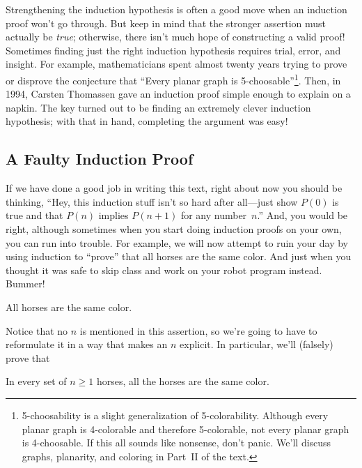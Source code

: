 Strengthening the induction hypothesis is often a good move when an
induction proof won't go through.  But keep in mind that the stronger
assertion must actually be \emph{true}; otherwise, there isn't much hope
of constructing a valid proof!  Sometimes finding just the right induction
hypothesis requires trial, error, and insight.  For example,
mathematicians spent almost twenty years trying to prove or disprove the
conjecture that ``Every planar graph is
5-choosable''\footnote{5-choosability is a slight generalization of
  5-colorability.  Although every planar graph is 4-colorable and
  therefore 5-colorable, not every planar graph is 4-choosable.  If this
  all sounds like nonsense, don't panic.  We'll discuss graphs, planarity,
  and coloring in Part~II of the text.}.  Then, in 1994, Carsten Thomassen
gave an induction proof simple enough to explain on a napkin.  The key
turned out to be finding an extremely clever induction hypothesis; with
that in hand, completing the argument was easy!


\subsection{A Faulty Induction Proof}

If we have done a good job in writing this text, right about now you
should be thinking, ``Hey, this induction stuff isn't so hard after
all---just show $P(0)$ is true and that $P(n)$ implies $P(n+1)$ for
any number~$n$.''  And, you would be right, although sometimes when
you start doing induction proofs on your own, you can run into
trouble.  For example, we will now attempt to ruin your day by using
induction to ``prove'' that all horses are the same color.  And just
when you thought it was safe to skip class and work on your robot
program instead.  Bummer!

\begin{falsethm*}
All horses are the same color.
\end{falsethm*}

Notice that no $n$ is mentioned in this assertion, so we're going to have
to reformulate it in a way that makes an $n$ explicit.  In particular,
we'll (falsely) prove that

\begin{falsethm}\label{horses}
In every set of $n \geq 1$ horses, all the horses are the same color.
\end{falsethm}

